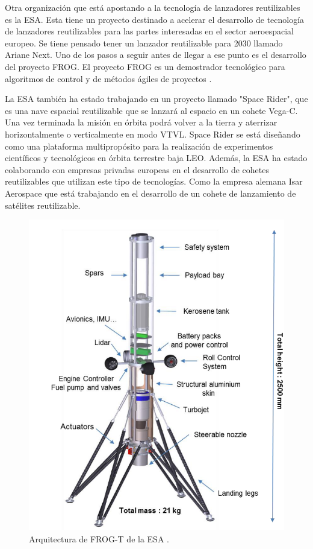 \medskip

Otra organización que está apostando a la tecnología de lanzadores reutilizables es la ESA. Esta tiene un proyecto destinado a acelerar el desarrollo de tecnología de lanzadores reutilizables para las partes interesadas en el sector aeroespacial europeo. Se tiene pensado tener un lanzador reutilizable para 2030 llamado Ariane Next. Uno de los pasos a seguir antes de llegar a ese punto es el desarrollo del proyecto FROG. El proyecto FROG es un demostrador tecnológico para algoritmos de control y de métodos ágiles de proyectos \cite{rmili2019frog}.

\medskip

La ESA también ha estado trabajando en un proyecto llamado "Space Rider", que es una nave
espacial reutilizable que se lanzará al espacio en un cohete Vega-C. Una vez terminada la misión en órbita podrá volver a la tierra y aterrizar horizontalmente o verticalmente en modo VTVL. Space Rider se está diseñando como una
plataforma multipropósito para la realización de experimentos científicos y tecnológicos en órbita
terrestre baja LEO. Además, la ESA ha estado colaborando con empresas privadas europeas en el
desarrollo de cohetes reutilizables que utilizan este tipo de tecnologías. Como la empresa alemana Isar
Aerospace que está trabajando en el desarrollo de un cohete de lanzamiento de satélites reutilizable.

\begin{figure}[htb]
    \centering
    \includegraphics[width=0.8\linewidth]{fig/frogTArch.png}
    \caption{Arquitectura de FROG-T de la ESA \cite{rmili2019frog}.}
    \label{fig:frogtarch}
\end{figure}

